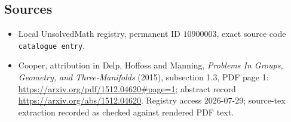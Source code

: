 \documentclass[11pt]{article}
\begin{document}
\subsection{Sources}
\begin{itemize}
\item Local UnsolvedMath registry, permanent ID \(10900003\), exact source code \texttt{catalogue entry}.
\item Cooper, attribution in Delp, Hoffoss and Manning, \emph{Problems In Groups, Geometry, and Three-Manifolds} (2015), subsection 1.3, PDF page 1: \url{https://arxiv.org/pdf/1512.04620#page=1}; abstract record \url{https://arxiv.org/abs/1512.04620}. Registry access 2026-07-29; source-tex extraction recorded as checked against rendered PDF text.
\end{itemize}
\end{document}

